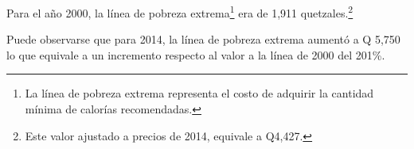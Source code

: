 Para el año 2000, la línea de pobreza extrema\footnote{La línea de pobreza extrema representa el costo de adquirir la cantidad mínima de calorías recomendadas.} era de 1,911 quetzales.\footnote{Este valor   ajustado a precios de 2014, equivale a Q4,427. }




 
 Puede observarse  que para 2014, la línea de pobreza extrema aumentó a Q 5,750 lo que equivale a un incremento respecto al valor a la línea de 2000 del 201\%.